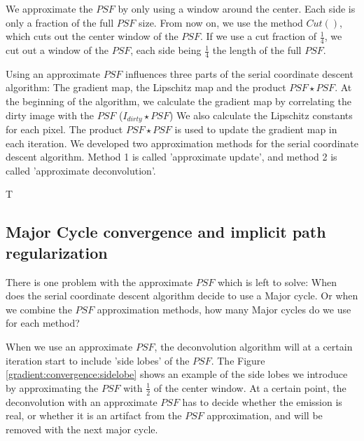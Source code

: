 We approximate the $PSF$ by only using a window around the center. Each side is only a fraction of the full $PSF$ size. From now on, we use the method $Cut()$, which cuts out the center window of the $PSF$. If we use a cut fraction of $\frac{1}{4}$, we cut out a window of the $PSF$, each side being  $\frac{1}{4}$ the length of the full $PSF$.

Using an approximate $PSF$ influences three parts of the serial coordinate descent algorithm: The gradient map, the Lipschitz map and the product $PSF \star PSF$. At the beginning of the algorithm, we calculate the gradient map by correlating the dirty image with the $PSF$ ($I_{dirty} \star PSF$) We also calculate the Lipschitz constants for each pixel. The product $PSF \star PSF$ is used to update the gradient map in each iteration. We developed two approximation methods for the serial coordinate descent algorithm. Method 1 is called 'approximate update', and method 2 is called 'approximate deconvolution'.

T


\subsection{Major Cycle convergence and implicit path regularization}\label{gradients:pathreg}
There is one problem with the approximate $PSF$ which is left to solve: When does the serial coordinate descent algorithm decide to use a Major cycle. Or when we combine the $PSF$ approximation methods, how many Major cycles do we use for each method?

When we use an approximate $PSF$, the deconvolution algorithm will at a certain iteration start to include 'side lobes' of the $PSF$. The Figure \ref{gradient:convergence:sidelobe} shows an example of the side lobes we introduce by approximating the $PSF$ with $\frac{1}{2}$ of the center window. At a certain point, the deconvolution with an approximate $PSF$ has to decide whether the emission is real, or whether it is an artifact from the $PSF$ approximation, and will be removed with the next major cycle.


